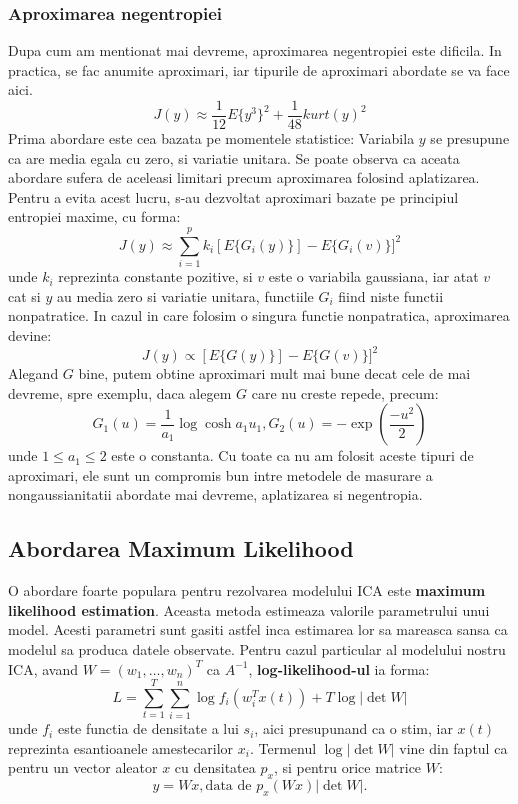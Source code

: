 \documentclass[12pt,oneside]{article}
\begin{document}
\subsubsection{Aproximarea negentropiei}
Dupa cum am mentionat mai devreme, aproximarea negentropiei este dificila. In practica, se fac anumite aproximari, iar tipurile de aproximari abordate se va face aici. 
\begin{equation}
	J(y)\approx \frac{1}{12}E\{y^3\}^2 + \frac{1}{48}kurt(y)^2
\end{equation}
Prima abordare este cea bazata pe momentele statistice:
Variabila $y$ se presupune ca are media egala cu zero, si variatie unitara. Se poate observa ca aceata abordare sufera de aceleasi limitari precum aproximarea folosind aplatizarea. Pentru a evita acest lucru, s-au dezvoltat aproximari bazate pe principiul entropiei maxime, cu forma:
\begin{equation}
	J(y)\approx\sum_{i=1}^p k_i[E\{G_i(y)\}]-E\{G_i(v)\}]^2
\end{equation}
unde $k_i$ reprezinta constante pozitive, si $v$ este o variabila gaussiana, iar atat $v$ cat si $y$ au media zero si variatie unitara, functiile $G_i$ fiind niste functii nonpatratice. In cazul in care folosim o singura functie nonpatratica, aproximarea devine:
\begin{equation}
	J(y)\propto[E\{G(y)\}]-E\{G(v)\}]^2
\end{equation}
Alegand $G$ bine, putem obtine aproximari mult mai bune decat cele de mai devreme, spre exemplu, daca alegem $G$ care nu creste repede, precum:
\begin{equation}
	G_1(u)=\frac{1}{a_1}\log \cosh a_1 u_1, G_2(u)=-\exp(\frac{-u^2}{2})
\end{equation}
unde $1\leq a_1 \leq 2$ este o constanta. Cu toate ca nu am folosit aceste tipuri de aproximari, ele sunt un compromis bun intre metodele de masurare a nongaussianitatii abordate mai devreme, aplatizarea si negentropia. 

\subsection{Abordarea Maximum Likelihood}
O abordare foarte populara pentru rezolvarea modelului ICA este \textbf{maximum likelihood estimation}. Aceasta metoda estimeaza valorile parametrului unui model.\cite{probability_concepts} Acesti parametri sunt gasiti astfel inca estimarea lor sa mareasca sansa ca modelul sa produca datele observate. Pentru cazul particular al modelului nostru ICA, avand $W=(w_1, \dots, w_n)^T$ ca $A^{-1}$, \textbf{log-likelihood-ul} ia forma:
\begin{equation}
	L=\sum_{t=1}^T \sum_{i=1}^n \log f_i(w_i^Tx(t)) + T \log |\det W|
\end{equation}
unde $f_i$ este functia de densitate a lui $s_i$, aici presupunand ca o stim, iar $x(t)$ reprezinta esantioanele amestecarilor $x_i$. Termenul $\log | \det W|$ vine din faptul ca pentru un vector aleator $x$ cu densitatea $p_x$, si pentru orice matrice $W$:
\begin{equation}
	y=Wx, \text{data de } p_x(Wx)|\det W|.
\end{equation}
\end{document}
